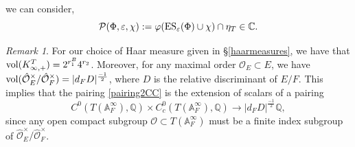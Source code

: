 \documentclass{amsart}
\theoremstyle{definition}
\theoremstyle{remark}
\newtheorem{remark}[theorem]{Remark}
\numberwithin{equation}{section}
\newcommand{\A}{{\mathbb A}}
\newcommand{\Q}{{\mathbb Q}}
\newcommand{\C}{{\mathbb C}}
\newcommand{\cP}{{\mathcal P}}
\newcommand{\cO}{{\mathcal O}}
\begin{document}
we can consider, 
\[
\cP(\Phi,\varepsilon,\chi):=\varphi({\rm ES}_\varepsilon(\Phi)\cup\chi)\cap\eta_T\in \C.
\]
\begin{remark}\label{algebraicitypairing}
    For our choice of Haar measure given in \S\ref{haarmeasures}, we have that ${\rm vol}(K^T_{\infty,+})=2^{r_1^B}4^{r_2}$. Moreover, for any maximal order $\cO_E\subset E$, we have ${\rm vol}(\hat\cO_E^\times/\hat\cO_F^\times)=|d_FD|^{\frac{-1}{2}}$, where $D$ is the relative discriminant of $E/F$. This implies that the pairing \eqref{pairing2CC} is the extension of scalars of a pairing
    \[
    C^0(T(\A_F^\infty),\Q)\times C_c^0(T(\A_F^\infty),\Q)\longrightarrow |d_FD|^{\frac{-1}{2}}\Q,
    \]
    since any open compact subgroup $\cO\subset T(\A_F^\infty)$ must be a finite index subgroup of $\hat\cO_E^\times/\hat\cO_F^\times$.
\end{remark}
\end{document}
